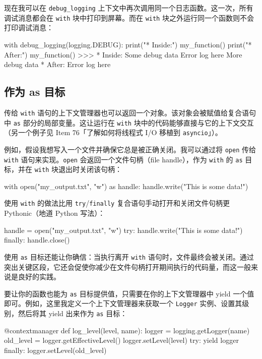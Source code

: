 现在我可以在 \texttt{debug\_logging} 上下文中再次调用同一个日志函数。这一次，所有调试消息都会在 \texttt{with} 块中打印到屏幕。而在 \texttt{with} 块之外运行同一个函数则不会打印调试消息：

\begin{codebox}[python]
with debug_logging(logging.DEBUG):
    print("* Inside:")
    my_function()
print("* After:")
my_function()
>>>
* Inside:
Some debug data
Error log here
More debug data
* After:
Error log here
\end{codebox}

\subsection{作为 as 目标}

传给 \texttt{with} 语句的上下文管理器也可以返回一个对象。该对象会被赋值给复合语句中 \texttt{as} 部分的局部变量。这让运行在 \texttt{with} 块中的代码能够直接与它的上下文交互（另一个例子见 Item 76「了解如何将线程式 I/O 移植到 \texttt{asyncio}」）。

例如，假设我想写入一个文件并确保它总是被正确关闭。我可以通过将 \texttt{open} 传给 \texttt{with} 语句来实现。\texttt{open} 会返回一个文件句柄（file handle），作为 \texttt{with} 的 \texttt{as} 目标，并在 \texttt{with} 块退出时关闭该句柄：

\begin{codebox}[python]
with open("my_output.txt", "w") as handle:
    handle.write("This is some data!")
\end{codebox}

使用 \texttt{with} 的做法比用 \texttt{try}/\texttt{finally} 复合语句手动打开和关闭文件句柄更 Pythonic（地道 Python 写法）：

\begin{codebox}[python]
handle = open("my_output.txt", "w")
try:
    handle.write("This is some data!")
finally:
    handle.close()
\end{codebox}

使用 \texttt{as} 目标还能让你确信：当执行离开 \texttt{with} 语句时，文件最终会被关闭。通过突出关键区段，它还会促使你减少在文件句柄打开期间执行的代码量，而这一般来说是良好的实践。

要让你的函数也能为 \texttt{as} 目标提供值，只需要在你的上下文管理器中 yield 一个值即可。例如，这里我定义一个上下文管理器来获取一个 \texttt{Logger} 实例、设置其级别，然后将其 yield 出来作为 \texttt{as} 目标：

\begin{codebox}[python]
@contextmanager
def log_level(level, name):
    logger = logging.getLogger(name)
    old_level = logger.getEffectiveLevel()
    logger.setLevel(level)
    try:
        yield logger
    finally:
        logger.setLevel(old_level)
\end{codebox}

